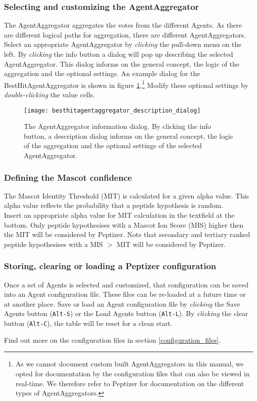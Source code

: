 \subsubsection{Selecting and customizing the AgentAggregator}
\npar The AgentAggregator aggregates the votes from the different Agents. As there are different logical paths for aggregation, there are different AgentAggregators. Select an appropriate AgentAggregator by \textit{clicking} the pull-down menu on the left. By \textit{clicking} the info button a dialog will pop up describing the selected AgentAggregator. This dialog informs on the general concept, the logic of the aggregation and the optional settings. An example dialog for the BestHitAgentAggregator is shown in figure \ref{besthitagentaggregator_description_dialog}.\footnote{As we cannot document custom built AgentAggregators in this manual, we opted for documentation by the configuration files that can also be viewed in real-time. We therefore refer to Peptizer for documentation on the different types of AgentAggregators.} Modify these optional settings by \textit{double-clicking} the value cells.
\begin{figure}[t!]
\begin{center}
	\texttt{[image: besthitagentaggregator\_description\_dialog]}
	\caption{\label{besthitagentaggregator_description_dialog} The AgentAggregator information dialog. By clicking the info button, a description dialog informs on the general concept, the logic of the aggregation and the optional settings of the selected AgentAggregator.}
\end{center}
\end{figure}
%
%
\subsubsection{Defining the Mascot confidence}
\npar The Mascot Identity Threshold (MIT) is calculated for a given alpha value. This alpha value reflects the probability that a peptide hypothesis is random.\\Insert an appropriate alpha value for MIT calculation in the textfield at the bottom. Only peptide hypothesises with a Mascot Ion Score (MIS) higher then the MIT will be considered by Peptizer. Note that secondary and tertiary ranked peptide hypothesises with a MIS $>$ MIT will be considered by Peptizer.
%
%
\subsubsection{Storing, clearing or loading a Peptizer configuration}
\npar Once a set of Agents is selected and customized, that configuration can be saved into an Agent configuration file. These files can be re-loaded at a future time or at another place. Save or load an Agent configuration file by \textit{clicking} the Save Agents button (\verb!Alt-S!) or the Load Agents button (\verb!Alt-L!). By \textit{clicking} the clear button (\verb!Alt-C!), the table will be reset for a clean start.
\par Find out more on the configuration files in section \ref{configuration_files}.
%
%
%

